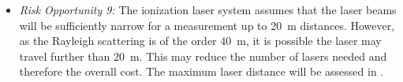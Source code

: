 \begin{itemize}
    \item \textit{Risk Opportunity 9:} The ionization laser system assumes that the laser beams will be sufficiently narrow for a measurement up to \SI{20}{m} distances. However, as the Rayleigh scattering is of the order \SI{40}{m}, it is possible the laser may travel further than \SI{20}{m}. This may reduce the number of lasers needed and therefore the overall cost. The maximum laser distance will be assessed in .
\end{itemize}



